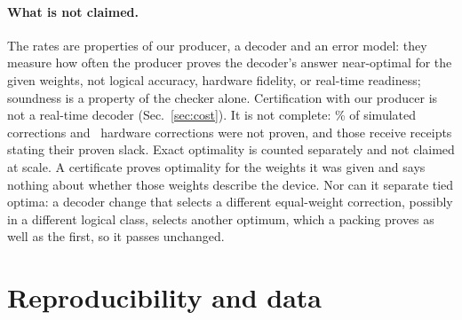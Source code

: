 \documentclass[aps,pra,twocolumn,superscriptaddress,nofootinbib,longbibliography,floatfix]{revtex4-2}
\begin{document}
\paragraph*{What is not claimed.} The rates are properties of our producer, a decoder and an error model: they measure how often the producer proves the decoder's answer near-optimal for the given weights, not logical accuracy, hardware fidelity, or real-time readiness; soundness is a property of the checker alone. Certification with our producer is not a real-time decoder (Sec.~\ref{sec:cost}). It is not complete: \EpsSimNotProvenPct\% of simulated corrections and \EpsHwNotProven\ hardware corrections were not proven, and those receive receipts stating their proven slack. Exact optimality is counted separately and not claimed at scale. A certificate proves optimality for the weights it was given and says nothing about whether those weights describe the device. Nor can it separate tied optima: a decoder change that selects a different equal-weight correction, possibly in a different logical class, selects another optimum, which a packing proves as well as the first, so it passes unchanged.

\section{Reproducibility and data}
\label{sec:repro}
\end{document}
